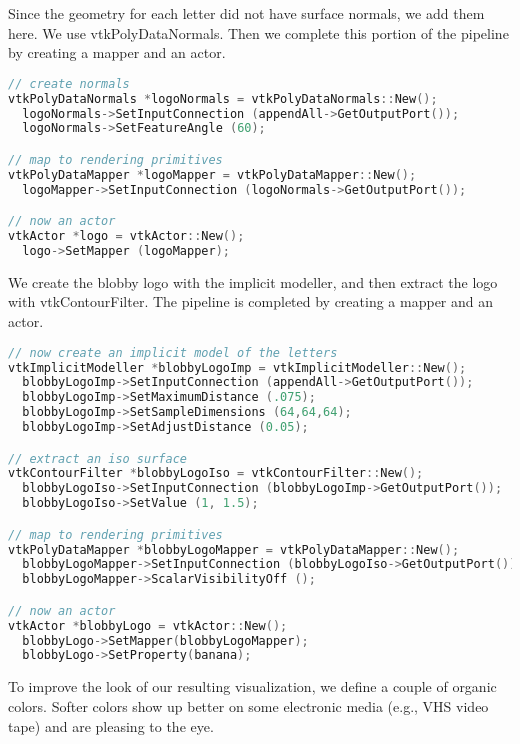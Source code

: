 Since the geometry for each letter did not have surface normals, we add them here. We use vtkPolyDataNormals. Then we complete this portion of the pipeline by creating a mapper and an actor.

\begin{lstlisting}[language=C++, caption={Add surface normals and create mapper and actor.}]
// create normals
vtkPolyDataNormals *logoNormals = vtkPolyDataNormals::New();
  logoNormals->SetInputConnection (appendAll->GetOutputPort());
  logoNormals->SetFeatureAngle (60);

// map to rendering primitives
vtkPolyDataMapper *logoMapper = vtkPolyDataMapper::New();
  logoMapper->SetInputConnection (logoNormals->GetOutputPort());

// now an actor
vtkActor *logo = vtkActor::New();
  logo->SetMapper (logoMapper);
\end{lstlisting}

We create the blobby logo with the implicit modeller, and then extract the logo with vtkContourFilter. The pipeline is completed by creating a mapper and an actor.

\begin{lstlisting}[language=C++, caption={Create an implicit model of the letters and extract the logo.}]
// now create an implicit model of the letters
vtkImplicitModeller *blobbyLogoImp = vtkImplicitModeller::New();
  blobbyLogoImp->SetInputConnection (appendAll->GetOutputPort());
  blobbyLogoImp->SetMaximumDistance (.075);
  blobbyLogoImp->SetSampleDimensions (64,64,64);
  blobbyLogoImp->SetAdjustDistance (0.05);

// extract an iso surface
vtkContourFilter *blobbyLogoIso = vtkContourFilter::New();
  blobbyLogoIso->SetInputConnection (blobbyLogoImp->GetOutputPort());
  blobbyLogoIso->SetValue (1, 1.5);

// map to rendering primitives
vtkPolyDataMapper *blobbyLogoMapper = vtkPolyDataMapper::New();
  blobbyLogoMapper->SetInputConnection (blobbyLogoIso->GetOutputPort());
  blobbyLogoMapper->ScalarVisibilityOff ();

// now an actor
vtkActor *blobbyLogo = vtkActor::New();
  blobbyLogo->SetMapper(blobbyLogoMapper);
  blobbyLogo->SetProperty(banana);
\end{lstlisting}

To improve the look of our resulting visualization, we define a couple of organic colors. Softer colors show up better on some electronic media (e.g., VHS video tape) and are pleasing to the eye.

